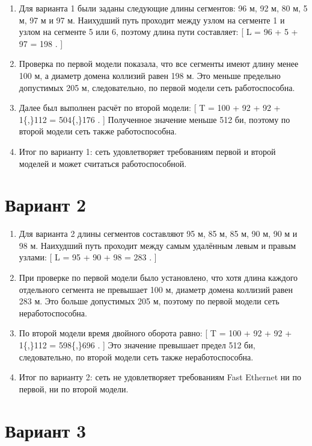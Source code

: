 \documentclass[
  english,
  russian,
  12pt,
  a4paper,
  DIV=11,
  numbers=noendperiod]{scrreprt}
\begin{document}
\begin{enumerate}
\def\labelenumi{\arabic{enumi}.}
\item
  Для варианта 1 были заданы следующие длины сегментов: 96 м, 92 м, 80
  м, 5 м, 97 м и 97 м. Наихудший путь проходит между узлом на сегменте 1
  и узлом на сегменте 5 или 6, поэтому длина пути составляет: {[} L = 96
  + 5 + 97 = 198 . {]}
\item
  Проверка по первой модели показала, что все сегменты имеют длину менее
  100 м, а диаметр домена коллизий равен 198 м. Это меньше предельно
  допустимых 205 м, следовательно, по первой модели сеть работоспособна.
\item
  Далее был выполнен расчёт по второй модели: {[} T = 100 + 92 + 92 +
  1\{,\}112  = 504\{,\}176 . {]} Полученное значение
  меньше 512 би, поэтому по второй модели сеть также работоспособна.
\item
  Итог по варианту 1: сеть удовлетворяет требованиям первой и второй
  моделей и может считаться работоспособной.
\end{enumerate}

\section{Вариант 2}\label{ux432ux430ux440ux438ux430ux43dux442-2}

\begin{enumerate}
\def\labelenumi{\arabic{enumi}.}
\item
  Для варианта 2 длины сегментов составляют 95 м, 85 м, 85 м, 90 м, 90 м
  и 98 м. Наихудший путь проходит между самым удалённым левым и правым
  узлами: {[} L = 95 + 90 + 98 = 283 . {]}
\item
  При проверке по первой модели было установлено, что хотя длина каждого
  отдельного сегмента не превышает 100 м, диаметр домена коллизий равен
  283 м. Это больше допустимых 205 м, поэтому по первой модели сеть
  неработоспособна.
\item
  По второй модели время двойного оборота равно: {[} T = 100 + 92 + 92 +
  1\{,\}112  = 598\{,\}696 . {]} Это значение
  превышает предел 512 би, следовательно, по второй модели сеть также
  неработоспособна.
\item
  Итог по варианту 2: сеть не удовлетворяет требованиям Fast Ethernet ни
  по первой, ни по второй модели.
\end{enumerate}

\section{Вариант 3}\label{ux432ux430ux440ux438ux430ux43dux442-3}
\end{document}

